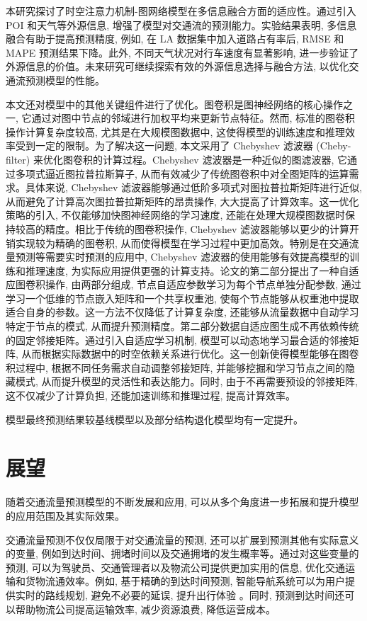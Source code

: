 本研究探讨了时空注意力机制-图网络模型在多信息融合方面的适应性。通过引入 POI 和天气等外源信息, 增强了模型对交通流的预测能力。实验结果表明, 多信息融合有助于提高预测精度, 例如, 在 LA 数据集中加入道路占有率后, RMSE 和 MAPE 预测结果下降。此外, 不同天气状况对行车速度有显著影响, 进一步验证了外源信息的价值。未来研究可继续探索有效的外源信息选择与融合方法, 以优化交通流预测模型的性能。

本文还对模型中的其他关键组件进行了优化。图卷积是图神经网络的核心操作之一, 它通过对图中节点的邻域进行加权平均来更新节点特征。然而, 标准的图卷积操作计算复杂度较高, 尤其是在大规模图数据中, 这使得模型的训练速度和推理效率受到一定的限制。为了解决这一问题, 本文采用了 Chebyshev 滤波器 (Cheby-filter) 来优化图卷积的计算过程。Chebyshev 滤波器是一种近似的图滤波器, 它通过多项式逼近图拉普拉斯算子, 从而有效减少了传统图卷积中对全图矩阵的运算需求。具体来说, Chebyshev 滤波器能够通过低阶多项式对图拉普拉斯矩阵进行近似, 从而避免了计算高次图拉普拉斯矩阵的昂贵操作, 大大提高了计算效率。这一优化策略的引入, 不仅能够加快图神经网络的学习速度, 还能在处理大规模图数据时保持较高的精度。相比于传统的图卷积操作, Chebyshev 滤波器能够以更少的计算开销实现较为精确的图卷积, 从而使得模型在学习过程中更加高效。特别是在交通流量预测等需要实时预测的应用中, Chebyshev 滤波器的使用能够有效提高模型的训练和推理速度, 为实际应用提供更强的计算支持。论文的第二部分提出了一种自适应图卷积操作, 由两部分组成, 节点自适应参数学习为每个节点单独分配参数, 通过学习一个低维的节点嵌入矩阵和一个共享权重池, 使每个节点能够从权重池中提取适合自身的参数。这一方法不仅降低了计算复杂度, 还能够从流量数据中自动学习特定于节点的模式, 从而提升预测精度。第二部分数据自适应图生成不再依赖传统的固定邻接矩阵。通过引入自适应学习机制, 模型可以动态地学习最合适的邻接矩阵, 从而根据实际数据中的时空依赖关系进行优化。这一创新使得模型能够在图卷积过程中, 根据不同任务需求自动调整邻接矩阵, 并能够挖掘和学习节点之间的隐藏模式, 从而提升模型的灵活性和表达能力。同时, 由于不再需要预设的邻接矩阵, 这不仅减少了计算负担, 还能加速训练和推理过程, 提高计算效率。

模型最终预测结果较基线模型以及部分结构退化模型均有一定提升。


\section{展望}


随着交通流量预测模型的不断发展和应用, 可以从多个角度进一步拓展和提升模型的应用范围及其实际效果。

交通流量预测不仅仅局限于对交通流量的预测, 还可以扩展到预测其他有实际意义的变量, 例如到达时间、拥堵时间以及交通拥堵的发生概率等。通过对这些变量的预测, 可以为驾驶员、交通管理者以及物流公司提供更加实用的信息, 优化交通运输和货物流通效率。例如, 基于精确的到达时间预测, 智能导航系统可以为用户提供实时的路线规划, 避免不必要的延误, 提升出行体验 \parencite{2023_李琦_环形交叉口出口关联道路干线协调控制研究}。同时, 预测到达时间还可以帮助物流公司提高运输效率, 减少资源浪费, 降低运营成本。

